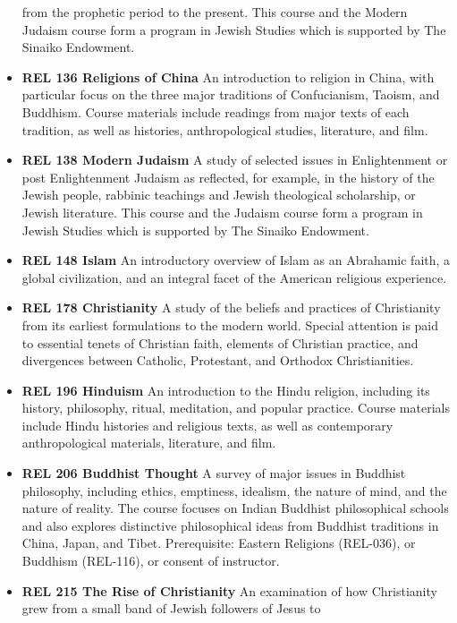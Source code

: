 \documentclass[
  letterpaper,
]{scrbook}
\begin{document}
\begin{itemize}
  from the prophetic period to the present. This course and the Modern
  Judaism course form a program in Jewish Studies which is supported by
  The Sinaiko Endowment.
\item
  \textbf{REL 136 Religions of China} An introduction to religion in
  China, with particular focus on the three major traditions of
  Confucianism, Taoism, and Buddhism. Course materials include readings
  from major texts of each tradition, as well as histories,
  anthropological studies, literature, and film.\\
\item
  \textbf{REL 138 Modern Judaism} A study of selected issues in
  Enlightenment or post Enlightenment Judaism as reflected, for example,
  in the history of the Jewish people, rabbinic teachings and Jewish
  theological scholarship, or Jewish literature. This course and the
  Judaism course form a program in Jewish Studies which is supported by
  The Sinaiko Endowment.
\item
  \textbf{REL 148 Islam} An introductory overview of Islam as an
  Abrahamic faith, a global civilization, and an integral facet of the
  American religious experience.\\
\item
  \textbf{REL 178 Christianity} A study of the beliefs and practices of
  Christianity from its earliest formulations to the modern world.
  Special attention is paid to essential tenets of Christian faith,
  elements of Christian practice, and divergences between Catholic,
  Protestant, and Orthodox Christianities.
\item
  \textbf{REL 196 Hinduism} An introduction to the Hindu religion,
  including its history, philosophy, ritual, meditation, and popular
  practice. Course materials include Hindu histories and religious
  texts, as well as contemporary anthropological materials, literature,
  and film.
\item
  \textbf{REL 206 Buddhist Thought} A survey of major issues in Buddhist
  philosophy, including ethics, emptiness, idealism, the nature of mind,
  and the nature of reality. The course focuses on Indian Buddhist
  philosophical schools and also explores distinctive philosophical
  ideas from Buddhist traditions in China, Japan, and Tibet.
  Prerequisite: Eastern Religions (REL-036), or Buddhism (REL-116), or
  consent of instructor.
\item
  \textbf{REL 215 The Rise of Christianity} An examination of how
  Christianity grew from a small band of Jewish followers of Jesus to

\end{itemize}
\end{document}

